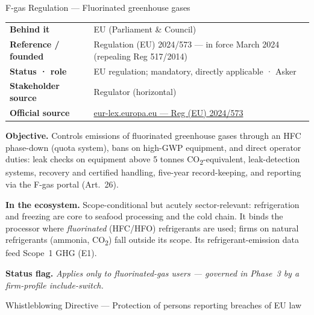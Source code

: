 F-gas Regulation --- Fluorinated greenhouse gases

{\def\LTcaptype{none}
\begin{longtable}[]{@{}
  >{\raggedright\arraybackslash}p{}
  >{\raggedright\arraybackslash}p{}@{}}
\toprule\noalign{}
\endhead
\bottomrule\noalign{}
\endlastfoot
\textbf{Behind it} & EU (Parliament \& Council) \\
\textbf{Reference / founded} & Regulation (EU) 2024/573 --- in force March 2024 (repealing Reg 517/2014) \\
\textbf{Status · role} & EU regulation; mandatory, directly applicable · Asker \\
\textbf{Stakeholder source} & Regulator (horizontal) \\
\textbf{Official source} & \href{https://eur-lex.europa.eu/eli/reg/2024/573/oj}{eur-lex.europa.eu --- Reg (EU) 2024/573} \\
\end{longtable}
}

\textbf{Objective.} Controls emissions of fluorinated greenhouse gases through an HFC phase-down (quota system), bans on high-GWP equipment, and direct operator duties: leak checks on equipment above 5 tonnes CO\textsubscript{2}-equivalent, leak-detection systems, recovery and certified handling, five-year record-keeping, and reporting via the F-gas portal (Art.~26).

\textbf{In the ecosystem.} Scope-conditional but acutely sector-relevant: refrigeration and freezing are core to seafood processing and the cold chain. It binds the processor where \emph{fluorinated} (HFC/HFO) refrigerants are used; firms on natural refrigerants (ammonia, CO\textsubscript{2}) fall outside its scope. Its refrigerant-emission data feed Scope~1 GHG (E1).

\textbf{Status flag.} \emph{Applies only to fluorinated-gas users --- governed in Phase~3 by a firm-profile include-switch.}

Whistleblowing Directive --- Protection of persons reporting breaches of EU law

